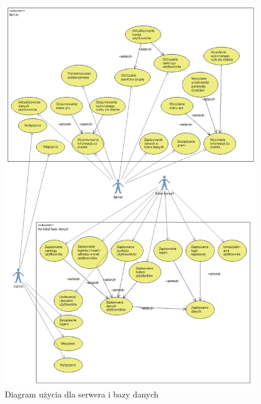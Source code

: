 \documentclass[12pt]{article}
\begin{document}
\newpage

\begin{figure}[!ht]
  \centering
	\includegraphics[scale=0.5]{serverUseCase}
	 \caption{Diagram użycia dla serwera i bazy danych}
\end{figure}
\end{document}
